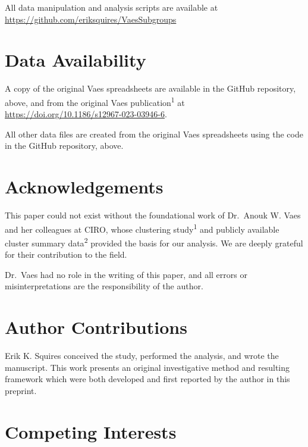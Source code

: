 \documentclass[
  letterpaper,
  DIV=11,
  numbers=noendperiod]{scrartcl}
\begin{document}
All data manipulation and analysis scripts are available at
\url{https://github.com/eriksquires/VaesSubgroups}

\section*{Data Availability}\label{sec-data}

A copy of the original Vaes spreadsheets are available in the GitHub
repository, above, and from the original Vaes
publication\textsuperscript{1} at
\url{https://doi.org/10.1186/s12967-023-03946-6}.

All other data files are created from the original Vaes spreadsheets
using the code in the GitHub repository, above.

\newpage{}

\section*{Acknowledgements}\label{acknowledgements}

This paper could not exist without the foundational work of Dr.~Anouk W.
Vaes and her colleagues at CIRO, whose clustering
study\textsuperscript{1} and publicly available cluster summary
data\textsuperscript{2} provided the basis for our analysis. We are
deeply grateful for their contribution to the field.

Dr.~Vaes had no role in the writing of this paper, and all errors or
misinterpretations are the responsibility of the author.

\section*{Author Contributions}\label{author-contributions}

Erik K. Squires conceived the study, performed the analysis, and wrote
the manuscript. This work presents an original investigative method and
resulting framework which were both developed and first reported by the
author in this preprint.

\section*{Competing Interests}\label{competing-interests}
\end{document}
